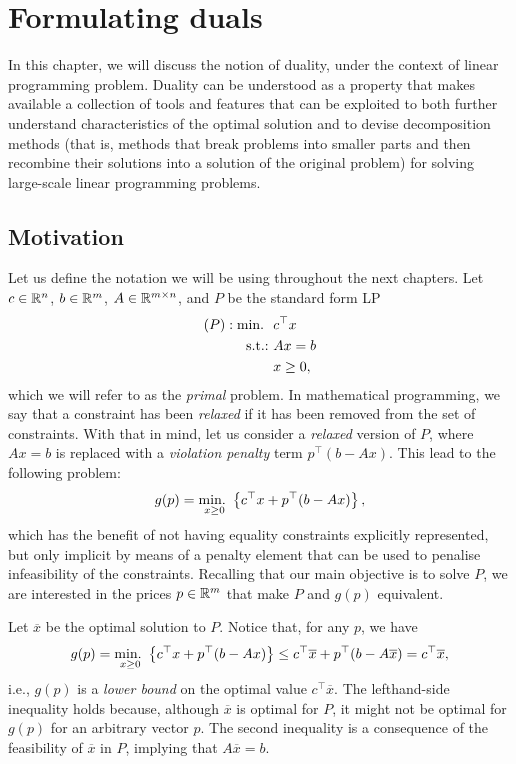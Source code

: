 \section{Formulating duals}

In this chapter, we will discuss the notion of duality, under the context of linear programming problem. Duality can be understood as a property that makes available a collection of tools and features that can be exploited to both further understand characteristics of the optimal solution and to devise decomposition methods (that is, methods that break problems into smaller parts and then recombine their solutions into a solution of the original problem)  for solving large-scale linear programming problems.


\subsection{Motivation}

Let us define the notation we will be using throughout the next chapters. Let $c \in \mathbb{R}^n$, $b \in \mathbb{R}^m$, $A \in \mathbb{R}^{m \times n}$, and $P$ be the standard form LP
%
\begin{align*}
	(P) : \mathop{\text{min.~}} \ & c^\top x \\
	\mathop{\text{s.t.:~}} 	  & Ax = b \\
		  & x \geq 0,   
\end{align*}
%
which we will refer to as the \emph{primal} problem.  In mathematical programming, we say that a constraint has been \emph{relaxed} if it has been removed from the set of constraints. With that in mind, let us consider a \emph{relaxed} version of $P$, where $Ax = b$ is replaced with a \emph{violation penalty} term $p^\top (b - Ax)$. This lead to the following problem:
%
\begin{equation*}
	g(p) = \mathop{\text{min.~}}_{x \geq 0} \left\{ c^\top x + p^\top (b - Ax) \right \},
\end{equation*}
%
which has the benefit of not having equality constraints explicitly represented, but only implicit by means of a penalty element that can be used to penalise infeasibility of the constraints. Recalling that our main objective is to solve $P$, we are interested in the prices $p \in \mathbb{R}^m$ that make $P$ and $g(p)$ equivalent.

Let $\overline{x}$ be the optimal solution to $P$. Notice that, for any $p$, we have
%
\begin{equation*}
	g(p) = \mathop{\text{min.~}}_{x \geq 0} \left\{ c^\top x + p^\top (b - Ax) \right \} \leq c^\top \overline{x} +  p^\top (b - A\overline{x}) = c^\top \overline{x},   
\end{equation*}
%
i.e., $g(p)$ is a \emph{lower bound} on the optimal value $c^\top \overline{x}$. The lefthand-side inequality holds because, although $\overline{x}$ is optimal for $P$, it might not be optimal for $g(p)$ for an arbitrary vector $p$. The second inequality is a consequence of the feasibility of $\overline{x}$ in $P$, implying that $A\overline{x} = b$.

